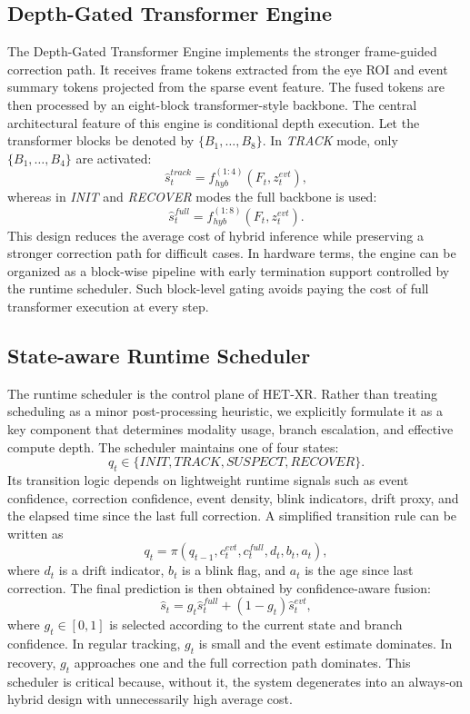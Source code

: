 \documentclass[journal]{IEEEtran}
\begin{document}
\subsection{Depth-Gated Transformer Engine}
The Depth-Gated Transformer Engine implements the stronger frame-guided correction path. It receives frame tokens extracted from the eye ROI and event summary tokens projected from the sparse event feature. The fused tokens are then processed by an eight-block transformer-style backbone.
%
The central architectural feature of this engine is conditional depth execution. Let the transformer blocks be denoted by $\{B_1,\ldots,B_8\}$. In \textit{TRACK} mode, only $\{B_1,\ldots,B_4\}$ are activated:
\begin{equation}
\hat{s}_t^{track} = f_{hyb}^{(1:4)}(F_t, z_t^{evt}),
\end{equation}
whereas in \textit{INIT} and \textit{RECOVER} modes the full backbone is used:
\begin{equation}
\hat{s}_t^{full} = f_{hyb}^{(1:8)}(F_t, z_t^{evt}).
\end{equation}
%
This design reduces the average cost of hybrid inference while preserving a stronger correction path for difficult cases. In hardware terms, the engine can be organized as a block-wise pipeline with early termination support controlled by the runtime scheduler. Such block-level gating avoids paying the cost of full transformer execution at every step.
%
\subsection{State-aware Runtime Scheduler}
The runtime scheduler is the control plane of HET-XR. Rather than treating scheduling as a minor post-processing heuristic, we explicitly formulate it as a key component that determines modality usage, branch escalation, and effective compute depth.
%
The scheduler maintains one of four states:
\begin{equation}
q_t \in \{\textit{INIT},\textit{TRACK},\textit{SUSPECT},\textit{RECOVER}\}.
\end{equation}
Its transition logic depends on lightweight runtime signals such as event confidence, correction confidence, event density, blink indicators, drift proxy, and the elapsed time since the last full correction. A simplified transition rule can be written as
\begin{equation}
q_t = \pi(q_{t-1}, c_t^{evt}, c_t^{full}, d_t, b_t, a_t),
\end{equation}
where $d_t$ is a drift indicator, $b_t$ is a blink flag, and $a_t$ is the age since last correction.
%
The final prediction is then obtained by confidence-aware fusion:
\begin{equation}
\hat{s}_t = g_t \hat{s}_t^{full} + (1-g_t)\hat{s}_t^{evt},
\end{equation}
where $g_t \in [0,1]$ is selected according to the current state and branch confidence. In regular tracking, $g_t$ is small and the event estimate dominates. In recovery, $g_t$ approaches one and the full correction path dominates.
%
This scheduler is critical because, without it, the system degenerates into an always-on hybrid design with unnecessarily high average cost.
%
\end{document}
